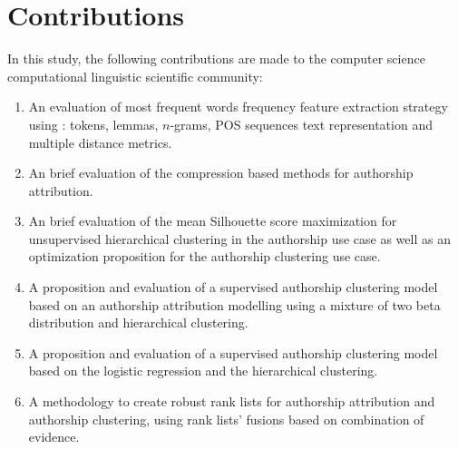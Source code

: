 \section{Contributions}

In this study, the following contributions are made to the computer science computational linguistic scientific community:

\begin{enumerate}
  \item
  An evaluation of most frequent words frequency feature extraction strategy using : tokens, lemmas, $n$-grams, POS sequences text representation and multiple distance metrics.
  \item
  An brief evaluation of the compression based methods for authorship attribution.
  \item
  An brief evaluation of the mean Silhouette score maximization for unsupervised hierarchical clustering in the authorship use case as well as an optimization proposition for the authorship clustering use case.
  \item
  A proposition and evaluation of a supervised authorship clustering model based on an authorship attribution modelling using a mixture of two beta distribution and hierarchical clustering.
  \item
  A proposition and evaluation of a supervised authorship clustering model based on the logistic regression and the hierarchical clustering.
  \item
  A methodology to create robust rank lists for authorship attribution and authorship clustering, using rank lists' fusions based on combination of evidence.
\end{enumerate}
